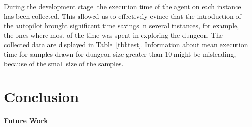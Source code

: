 \documentclass{llncs}
\begin{document}
During the development stage, the execution time of the agent on each instance has been collected.
This allowed us to effectively evince that the introduction of the autopilot brought significant time savings in several instances, for example, the ones where most of the time was spent in exploring the dungeon.
The collected data are displayed in Table~\ref{tbl:test}. Information about mean execution time for samples drawn for dungeon size greater than 10 might be misleading, because of the small size of the samples.

\section{Conclusion}


\paragraph{Future Work}

\newpage
{}
\appendix
\footnotesize

\begin{multicols}{2}

\end{multicols}


\end{document}
